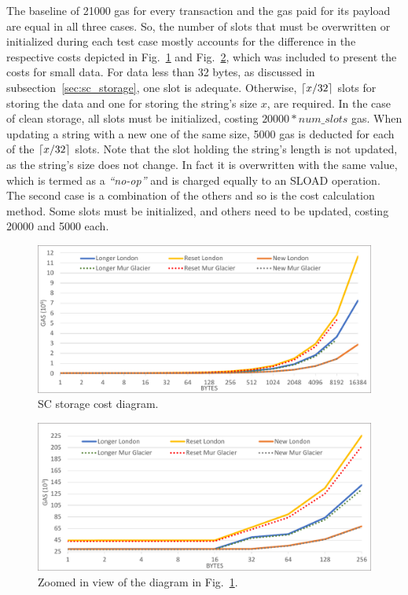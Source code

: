 The baseline of 21000 gas for every transaction and the gas paid for its payload are equal in all three cases. So, the number of slots that must be overwritten or initialized during each test case mostly accounts for the difference in the respective costs depicted in Fig.~\ref{fig:store1} and Fig.~\ref{fig:store2}, which was included to present the costs for small data. For data less than 32 bytes, as discussed in subsection~\ref{sec:sc_storage}, one slot is adequate. Otherwise, \(\ceil*{x/32}\) slots for storing the data and one for storing the string's size \(x\), are required. In the case of clean storage, all slots must be initialized, costing \(20000*num\_slots\) gas. When updating a string with a new one of the same size, 5000 gas is deducted for each of the \(\ceil*{x/32}\) slots. Note that the slot holding the string’s length is not updated, as the string’s size does not change. In fact it is overwritten with the same value, which is termed as a \emph{``no-op''} and is charged equally to an SLOAD operation. The second case is a combination of the others and so is the cost calculation method. Some slots must be initialized, and others need to be updated, costing 20000 and 5000 each.

\begin{figure}[htbp]
\centerline{\includegraphics[width=\textwidth]{figs/store1.pdf}}
\caption{SC storage cost diagram.}
\label{fig:store1}
\end{figure}

\begin{figure}[htbp]
\centerline{\includegraphics[width=\textwidth]{figs/store2.pdf}}
\caption{Zoomed in view of the diagram in Fig.~\ref{fig:store1}.}
\label{fig:store2}
\end{figure}

